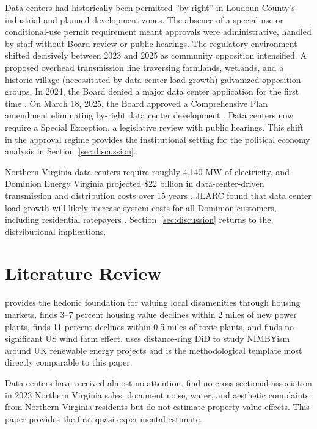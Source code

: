 \documentclass[12pt]{article}
\begin{document}
Data centers had historically been permitted ''by-right'' in Loudoun County's industrial and planned development zones. The absence of a special-use or conditional-use permit requirement meant approvals were administrative, handled by staff without Board review or public hearings. The regulatory environment shifted decisively between 2023 and 2025 as community opposition intensified. A proposed overhead transmission line traversing farmlands, wetlands, and a historic village (necessitated by data center load growth) galvanized opposition groups. In 2024, the Board denied a major data center application for the first time \citep{LoudounBOS2025}. On March 18, 2025, the Board approved a Comprehensive Plan amendment eliminating by-right data center development \citep{LoudounBOS2025}. Data centers now require a Special Exception, a legislative review with public hearings. This shift in the approval regime provides the institutional setting for the political economy analysis in Section~\ref{sec:discussion}.

Northern Virginia data centers require roughly 4,140 MW of electricity, and Dominion Energy Virginia projected \$22 billion in data-center-driven transmission and distribution costs over 15 years \citep{JLARC2024}. JLARC found that data center load growth will likely increase system costs for all Dominion customers, including residential ratepayers \citep{JLARC2024, DeCarolis2025}. Section~\ref{sec:discussion} returns to the distributional implications.

\section{Literature Review}
\label{sec:literature}

\citet{Rosen1974} provides the hedonic foundation for valuing local disamenities through housing markets. \citet{Davis2011} finds 3--7 percent housing value declines within 2 miles of new power plants, \citet{Currie2015} finds 11 percent declines within 0.5 miles of toxic plants, and \citet{Hoen2015} finds no significant US wind farm effect. \citet{Jarvis2025} uses distance-ring DiD to study NIMBYism around UK renewable energy projects and is the methodological template most directly comparable to this paper.

Data centers have received almost no attention. \citet{Waters2025} find no cross-sectional association in 2023 Northern Virginia sales. \citet{Hogan2025} document noise, water, and aesthetic complaints from Northern Virginia residents but do not estimate property value effects. This paper provides the first quasi-experimental estimate.
\end{document}
